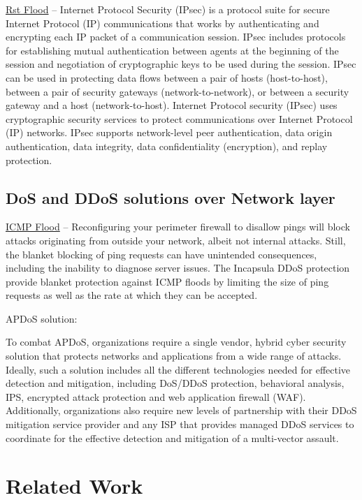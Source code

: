 \documentclass{report}
\begin{document}
 \hfill \break \underline{Rst Flood} – Internet Protocol Security (IPsec) is a protocol suite for secure Internet Protocol (IP) communications that works by authenticating and encrypting each IP packet of a communication session. IPsec includes protocols for establishing mutual authentication between agents at the beginning of the session and negotiation of cryptographic keys to be used during the session. IPsec can be used in protecting data flows between a pair of hosts (host-to-host), between a pair of security gateways (network-to-network), or between a security gateway and a host (network-to-host). Internet Protocol security (IPsec) uses cryptographic security services to protect communications over Internet Protocol (IP) networks. IPsec supports network-level peer authentication, data origin authentication, data integrity, data confidentiality (encryption), and replay protection.

\section {DoS and DDoS solutions over Network layer} 

 \hfill \break \underline{ICMP Flood} – Reconfiguring your perimeter firewall to disallow pings will block attacks originating from outside your network, albeit not internal attacks. Still, the blanket blocking of ping requests can have unintended consequences, including the inability to diagnose server issues.
The Incapsula DDoS protection provide blanket protection against ICMP floods by limiting the size of ping requests as well as the rate at which they can be accepted.



 \hfill \break  APDoS solution:

 \hfill \break To combat APDoS, organizations require a single vendor, hybrid cyber security solution that protects networks and applications from a wide range of attacks. Ideally, such a solution includes all the different technologies needed for effective detection and mitigation, including DoS/DDoS protection, behavioral analysis, IPS, encrypted attack protection and web application firewall (WAF). Additionally, organizations also require new levels of partnership with their DDoS mitigation service provider and any ISP that provides managed DDoS services to coordinate for the effective detection and mitigation of a multi-vector assault.

\newpage


\chapter {Related Work}
\end{document}
